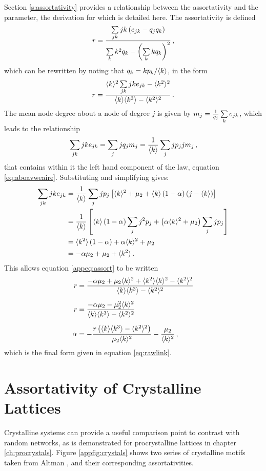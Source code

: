 Section \ref{s:assortativity} provides a relationship between the assortativity  and the \aw{} parameter, the derivation for which is detailed here.
The assortativity is defined
\begin{equation}
	r = \frac{\sum\limits_{jk} jk\left(e_{jk}-q_jq_k\right)}{\sum\limits_k k^2q_k - \left(\sum\limits_k kq_k\right)^2}\,,
\end{equation}
which can be rewritten by noting that $q_k=kp_k/\langle k \rangle$, in the form
\begin{equation}
	\label{appeq:assort}
	r = \frac{\langle k \rangle^2\sum\limits_{jk} jke_{jk}-\langle k^2 \rangle^2}{\langle k \rangle\langle k^3 \rangle-\langle k^2 \rangle^2}\,.
\end{equation}
The mean node degree about a node of degree $j$ is given by $m_j=\frac{1}{q_j}\sum\limits_k e_{jk}$, which leads to the relationship
\begin{equation}
	\sum\limits_{jk} jk e_{jk} = \sum\limits_j jq_jm_j = \frac{1}{\langle k \rangle}\sum\limits_j jp_j jm_j\,,
\end{equation}
that contains within it the left hand component of the \aw{} law, equation \eqref{eq:aboavweaire}.
Substituting and simplifying gives:
\begin{align}
	\sum\limits_{jk} jk e_{jk} &= \frac{1}{\langle k \rangle}\sum\limits_j jp_j\left[\langle k \rangle^2+\mu_2+\langle k \rangle\left(1-\alpha\right)\left(j-\langle k \rangle\right)\right] \\
	&= \frac{1}{\langle k \rangle}\left[ \langle k \rangle\left(1-\alpha\right)\sum\limits_j j^2p_j + \left(\alpha\langle k \rangle^2+\mu_2\right)\sum\limits_j jp_j\right] \nonumber \\
	&= \langle k^2 \rangle\left(1-\alpha\right)+\alpha\langle k \rangle^2+\mu_2 \nonumber \\
	&=-\alpha\mu_2+\mu_2+\langle k^2 \rangle\,.
\end{align}
This allows equation \eqref{appeq:assort} to be written
\begin{align}
	r &= \frac{-\alpha\mu_2+\mu_2\langle k \rangle^2+\langle k^2 \rangle\langle k \rangle^2-\langle k^2 \rangle^2}{\langle k \rangle\langle k^3 \rangle-\langle k^2 \rangle^2} \\[0.5em]
	r &= \frac{-\alpha\mu_2-\mu_2^2\langle k \rangle^2}{\langle k \rangle\langle k^3 \rangle-\langle k^2 \rangle^2} \nonumber \\[0.5em]
	\alpha &= -\frac{r\left(\langle k \rangle\langle k^3 \rangle-\langle k^2 \rangle^2\right)}{\mu_2\langle k \rangle^2}-\frac{\mu_2}{\langle k \rangle^2}\,,
\end{align}
which is the final form given in equation \eqref{eq:rawlink}.

\clearpage
\section{Assortativity of Crystalline Lattices}
\label{app:crystals}

Crystalline systems can provide a useful comparison point to contrast with random networks, as is demonstrated for procrystalline lattices in chapter \ref{ch:procrystals}.
Figure \ref{appfig:crystals} shows two series of crystalline motifs taken from Altman \etal{} \cite{Malashevich2016}, and their corresponding assortativities.

